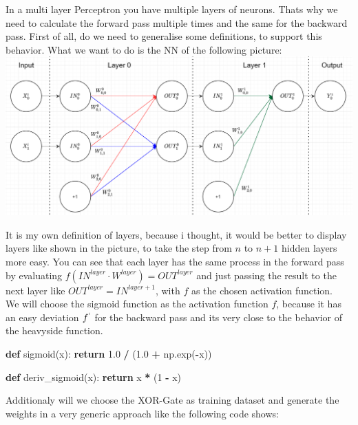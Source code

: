 \documentclass[
]{book}
\newenvironment{Shaded}{\begin{snugshade}}{\end{snugshade}}
\newcommand{\ControlFlowTok}[1]{\textcolor[rgb]{0.13,0.29,0.53}{\textbf{#1}}}
\newcommand{\DecValTok}[1]{\textcolor[rgb]{0.00,0.00,0.81}{#1}}
\newcommand{\FloatTok}[1]{\textcolor[rgb]{0.00,0.00,0.81}{#1}}
\newcommand{\KeywordTok}[1]{\textcolor[rgb]{0.13,0.29,0.53}{\textbf{#1}}}
\newcommand{\NormalTok}[1]{#1}
\newcommand{\OperatorTok}[1]{\textcolor[rgb]{0.81,0.36,0.00}{\textbf{#1}}}
\begin{document}
In a multi layer Perceptron you have multiple layers of neurons. Thats why we need to calculate the forward pass multiple times and the same for the backward pass. First of all, do we need to generalise some definitions, to support this behavior. What we want to do is the NN of the following picture:\\
\includegraphics[width=1\textwidth,height=\textheight]{./img/NN_03_new.png}

It is my own definition of layers, because i thought, it would be better to display layers like shown in the picture, to take the step from \(n\) to \(n+1\) hidden layers more easy. You can see that each layer has the same process in the forward pass by evaluating \(f(IN^{layer} \cdot W^{layer}) = OUT^{layer}\) and just passing the result to the next layer like \(OUT^{layer} = IN^{layer+1}\), with \(f\) as the chosen activation function.\\
We will choose the sigmoid function as the activation function \(f\), because it has an easy deviation \(f^`\) for the backward pass and its very close to the behavior of the heavyside function.

\begin{Shaded}
\begin{Highlighting}[]
\KeywordTok{def}\NormalTok{ sigmoid(x):}
  \ControlFlowTok{return} \FloatTok{1.0} \OperatorTok{/}\NormalTok{ (}\FloatTok{1.0} \OperatorTok{+}\NormalTok{ np.exp(}\OperatorTok{{-}}\NormalTok{x))}

\KeywordTok{def}\NormalTok{ deriv\_sigmoid(x):}
  \ControlFlowTok{return}\NormalTok{ x }\OperatorTok{*}\NormalTok{ (}\DecValTok{1} \OperatorTok{{-}}\NormalTok{ x)}
\end{Highlighting}
\end{Shaded}

Additionaly will we choose the XOR-Gate as training dataset and generate the weights in a very generic approach like the following code shows:
\end{document}
